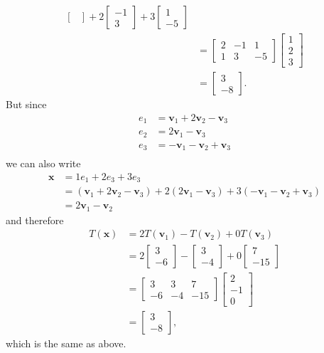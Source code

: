 \documentclass[12pt,letterpaper,reqno]{article}
\numberwithin{equation}{section}
\begin{document}
\begin{example}
\begin{align*}
\begin{bmatrix}
		\end{bmatrix}+2\begin{bmatrix}
			-1 \\ 3
		\end{bmatrix}+3\begin{bmatrix}
			1\\-5
		\end{bmatrix} \\
		&=\begin{bmatrix}
			2 & -1 & 1 \\
			1 & 3 & -5
		\end{bmatrix}\begin{bmatrix}
			1 \\ 2 \\ 3
		\end{bmatrix} \\
		&=\begin{bmatrix}
			3 \\ -8
		\end{bmatrix}.
	\end{align*}
But since 
\begin{align*}
	e_1&=\mathbf{v}_1+2\mathbf{v}_2-\mathbf{v}_3 \\
	e_2&=2\mathbf{v}_1-\mathbf{v}_3 \\
	e_3&=-\mathbf{v}_1-\mathbf{v}_2+\mathbf{v}_3 \\
\end{align*}	
we can also write
\begin{align*}
	\mathbf{x}&=1e_1+2e_3+3e_3 \\
	&=(\mathbf{v}_1+2\mathbf{v}_2-\mathbf{v}_3)+2(2\mathbf{v}_1-\mathbf{v}_3)+3(-\mathbf{v}_1-\mathbf{v}_2+\mathbf{v}_3) \\
	&=2\mathbf{v}_1-\mathbf{v}_2
\end{align*}	
and therefore
\begin{align*}
	T(\mathbf{x})&=2T(\mathbf{v}_1)-T(\mathbf{v}_2)+0T(\mathbf{v}_3) \\
	&=2\begin{bmatrix}
		3 \\ -6
	\end{bmatrix}-\begin{bmatrix}
		3 \\ -4
	\end{bmatrix}+0\begin{bmatrix}
		7 \\ -15
	\end{bmatrix} \\
	&=\begin{bmatrix}
		3 & 3 & 7 \\
		-6 & -4 & -15
	\end{bmatrix}\begin{bmatrix}
		2 \\ -1 \\ 0
	\end{bmatrix} \\
	&=\begin{bmatrix}
		3 \\ -8
	\end{bmatrix},
\end{align*}	
which is the same as above.
\end{example}
\end{document}
